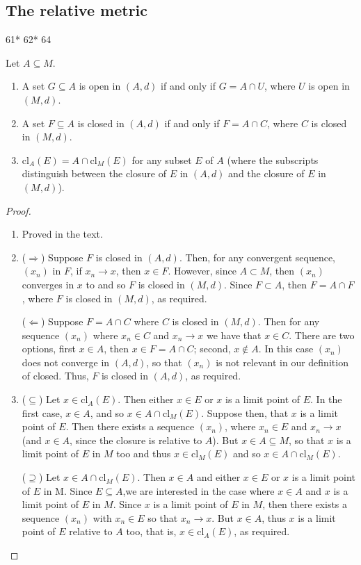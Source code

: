 \subsection{The relative metric}

61*
62*
64

\begin{exercise}{61}
Let $A\subseteq M$.
\begin{enumerate}
    \item A set $G\subseteq A$ is open in $(A,d)$ if and only if $G=A\cap U$, where $U$ is open in $(M,d)$.
    \item A set $F\subseteq A$ is closed in $(A,d)$ if and only if $F=A\cap C$, where $C$ is closed in $(M,d)$.
    \item $\text{cl}_A(E)=A\cap\text{cl}_M(E)$ for any subset $E$ of $A$ (where the subscripts distinguish between the closure of $E$ in $(A,d)$ and the closure of $E$ in $(M,d)$).
\end{enumerate}
\end{exercise}
\begin{proof}
\begin{enumerate}
    \item Proved in the text.
    \item ($\Rightarrow$)
    Suppose $F$ is closed in $(A,d)$.
    Then, for any convergent sequence, $(x_n)$ in $F$, if $x_n\to x$, then $x\in F$.
    However, since $A\subset M$, then $(x_n)$ converges in $x$ to and so $F$ is closed in $(M,d)$.
    Since $F\subset A$, then $F=A\cap F$, where $F$ is closed in $(M,d)$, as required.

    ($\Leftarrow$)
    Suppose $F=A\cap C$ where $C$ is closed in $(M,d)$.
    Then for any sequence $(x_n)$ where $x_n\in C$ and $x_n\to x$ we have that $x\in C$.
    There are two options, first $x\in A$, then $x\in F=A\cap C$;
    second, $x\notin A$.
    In this case $(x_n)$ does not converge in $(A,d)$, so that $(x_n)$ is not relevant in our definition of closed. 
    Thus, $F$ is closed in $(A,d)$, as required.
    \item ($\subseteq$)
    Let $x\in \text{cl}_A(E)$.
    Then either $x\in E$ or $x$ is a limit point of $E$.
    In the first case, $x\in A$, and so $x\in A\cap\text{cl}_M(E)$.
    Suppose then, that $x$ is a limit point of $E$.
    Then there exists a sequence $(x_n)$, where $x_n\in E$ and $x_n\to x$ (and $x\in A$, since the closure is relative to $A$).
    But $x\in A\subseteq M$, so that $x$ is a limit point of $E$ in $M$ too and thus $x\in\text{cl}_M(E)$ and so $x\in A\cap\text{cl}_M(E)$.

    ($\supseteq$)
    Let $x\in A\cap\text{cl}_M(E)$.
    Then $x\in A$ and either $x\in E$ or $x$ is a limit point of $E$ in M.
    Since $E\subseteq A$,we are interested in the case where $x\in A$ and $x$ is a limit point of $E$ in $M$.
    Since $x$ is a limit point of $E$ in $M$, then there exists a sequence $(x_n)$ with $x_n\in E$ so that $x_n\to x$.
    But $x\in A$, thus $x$ is a limit point of $E$ relative to $A$ too, that is, $x\in\text{cl}_A(E)$, as required.
\end{enumerate}
\end{proof} 

